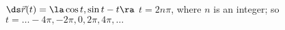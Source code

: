 {$\ds \vec r(t) = \la \cos t,\sin t - t\ra$
}
{
$t=2n\pi$, where $n$ is an integer; so $t = \ldots-4\pi,-2\pi,0,2\pi,4\pi,\ldots$
}

